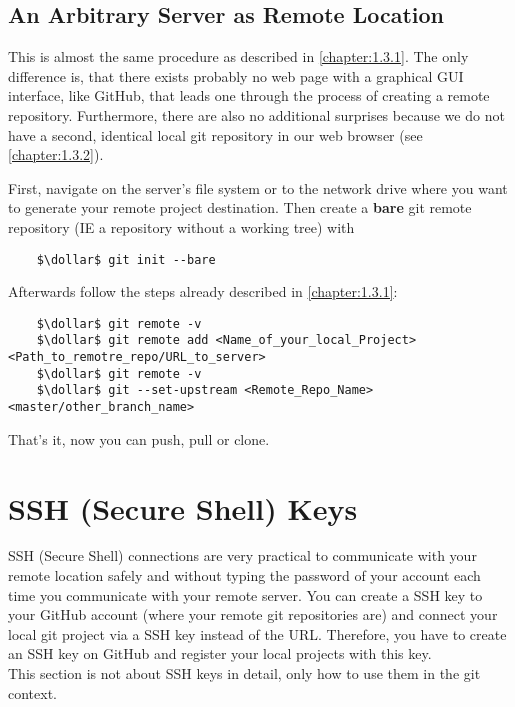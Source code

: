 \subsection{An Arbitrary Server as Remote Location}
\label{chapter:1.3.3}

This is almost the same procedure as described in \cref{chapter:1.3.1}. The only difference is, that there exists probably no web page with 
a graphical GUI interface, like GitHub, that leads one through the process of creating a remote repository. Furthermore, there are also no 
additional surprises because we do not have a second, identical local git repository in our web browser (see \cref{chapter:1.3.2}).

First, navigate on the server's file system or to the network drive where you want to generate your remote project destination. 
Then create a \textbf{bare} git remote repository (\ac{IE} a repository without a working tree) with
\begin{lstlisting}
	$\dollar$ git init --bare
\end{lstlisting}

Afterwards follow the steps already described in \cref{chapter:1.3.1}:
\begin{lstlisting}
	$\dollar$ git remote -v
	$\dollar$ git remote add <Name_of_your_local_Project> <Path_to_remotre_repo/URL_to_server>
	$\dollar$ git remote -v
	$\dollar$ git --set-upstream <Remote_Repo_Name> <master/other_branch_name>
\end{lstlisting}
That's it, now you can push, pull or clone.


\section{SSH (Secure Shell) Keys}
\label{chapter:1.4}

SSH (Secure Shell) connections are very practical to communicate with your remote location safely and without typing the password of your account each time you 
communicate with your remote server. You can create a SSH key to your GitHub account (where your remote git repositories are) and connect your local git project via 
a SSH key instead of the URL. Therefore, you have to create an SSH key on GitHub and register your local projects with this key.
\\
This section is not about SSH keys in detail, only how to use them in the git context. 



